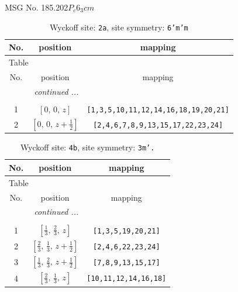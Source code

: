 \documentclass[fleqn,8pt]{jsarticle}
\begin{document}
\setcounter{MaxMatrixCols}{32}

\renewcommand{\tablename}{Table~}
\renewcommand{\figurename}{Figure~}
\begin{center}
\LARGE
MSG No. 185.202\quad$P_{c}6_{3}cm$
\end{center}
\renewcommand{\arraystretch}{1.2}
\begin{longtable}{ccc}
\caption{Wyckoff site: {\tt 2a}, site symmetry: {\tt 6'm'm}}
 \\
 \hline \hline
No. & position & mapping \\ \hline \endfirsthead

\multicolumn{2}{l}{\tablename\ \thetable{}} \\
 \hline \hline
No. & position & mapping \\ \hline \endhead

 \hline \hline
\multicolumn{2}{r}{\footnotesize\it continued ...} \\ \endfoot

 \hline \hline
\multicolumn{2}{r}{} \\ \endlastfoot

1 & $\left[ 0,\, 0,\, z \right]$ & {\tt [1,3,5,10,11,12,14,16,18,19,20,21]} \\ \hline
2 & $\left[ 0,\, 0,\, z + \frac{1}{2} \right]$ & {\tt [2,4,6,7,8,9,13,15,17,22,23,24]} \\
\end{longtable}
\renewcommand{\arraystretch}{1.2}
\begin{longtable}{ccc}
\caption{Wyckoff site: {\tt 4b}, site symmetry: {\tt 3m'.}}
 \\
 \hline \hline
No. & position & mapping \\ \hline \endfirsthead

\multicolumn{2}{l}{\tablename\ \thetable{}} \\
 \hline \hline
No. & position & mapping \\ \hline \endhead

 \hline \hline
\multicolumn{2}{r}{\footnotesize\it continued ...} \\ \endfoot

 \hline \hline
\multicolumn{2}{r}{} \\ \endlastfoot

1 & $\left[ \frac{1}{3},\, \frac{2}{3},\, z \right]$ & {\tt [1,3,5,19,20,21]} \\ \hline
2 & $\left[ \frac{2}{3},\, \frac{1}{3},\, z + \frac{1}{2} \right]$ & {\tt [2,4,6,22,23,24]} \\ \hline
3 & $\left[ \frac{1}{3},\, \frac{2}{3},\, z + \frac{1}{2} \right]$ & {\tt [7,8,9,13,15,17]} \\ \hline
4 & $\left[ \frac{2}{3},\, \frac{1}{3},\, z \right]$ & {\tt [10,11,12,14,16,18]} \\
\end{longtable}
\end{document}
